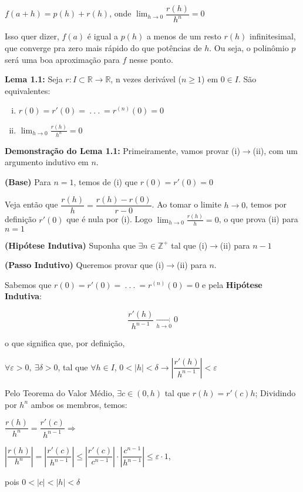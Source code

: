 \documentclass[12pt]{article}
\begin{document}
\begin{center}
    $f(a+h)=p(h)+r(h)$,            onde $\displaystyle\lim_{h\to0}\dfrac{r(h)}{h^n}=0$
\end{center}

Isso quer dizer, $f(a)$ é igual a $p(h)$ a menos de um resto $r(h)$ infinitesimal, que converge pra zero mais rápido do que potências de $h$. Ou seja, o polinômio $p$ será uma boa aproximação para $f$ nesse ponto.

\textbf{Lema 1.1: }\cite{lima1981curso} Seja $r:I\subset\mathbb{R}\longrightarrow\mathbb{R}$, n vezes derivável ($n\geq1$) em $0\in I$. São equivalentes:

\begin{enumerate}[i)]
    \item $r(0)=r'(0)=~.~.~.~=r^{(n)}(0)=0$
    \item $\displaystyle\lim_{h\to0}\frac{r(h)}{h^n}=0$
\end{enumerate}

\textbf{Demonstração do Lema 1.1:}\cite{lima1981curso}
Primeiramente, vamos provar (i)$\rightarrow$(ii), com um argumento indutivo em $n$.

\textbf{(Base)} Para $n=1$, temos de (i) que $r(0)=r'(0)=0$

Veja então que $\dfrac{r(h)}{h}=\dfrac{r(h)-r(0)}{r-0}$. Ao tomar o limite $h\to0$, temos por definição $r'(0)$ que é nula por (i). Logo $\displaystyle\lim_{h\to0}\frac{r(h)}{h}=0$, o que prova (ii) para $n=1$

\textbf{(Hipótese Indutiva)} Suponha que $\exists n\in\mathbb{Z}^+$ tal que (i)$\rightarrow$(ii) para $n-1$

\textbf{(Passo Indutivo)} Queremos provar que (i)$\rightarrow$(ii) para $n$.

Sabemos que $r(0)=r'(0)=~.~.~.~=r^{(n)}(0)=0$ e pela \textbf{Hipótese Indutiva}:

$$\dfrac{r'(h)}{h^{n-1}}\underset{h\to0}{\longrightarrow}0$$

o que significa que, por definição,

$\forall \varepsilon>0,~\exists\delta>0$, tal que $\forall h\in I$, $0<|h|<\delta\rightarrow\left|\dfrac{r'(h)}{h^{n-1}}\right|<\varepsilon$

Pelo Teorema do Valor Médio\cite{lima1981curso}, $\exists c\in (0,h)$ tal que $r(h) = r'(c)h$; Dividindo por $h^n$ ambos os membros, temos:
\begin{center}
$\dfrac{r(h)}{h^n}=\dfrac{r'(c)}{h^{n-1}}\Rightarrow$

$
\left|\dfrac{r(h)}{h^n}\right|=\left|\dfrac{r'(c)}{h^{n-1}}\right|\leq\left|\dfrac{r'(c)}{c^{n-1}}\right|\cdot\left|\dfrac{c^{n-1}}{h^{n-1}}\right|\leq \varepsilon\cdot1$,

pois $0<|c|<|h|<\delta$
\end{center}
\end{document}
